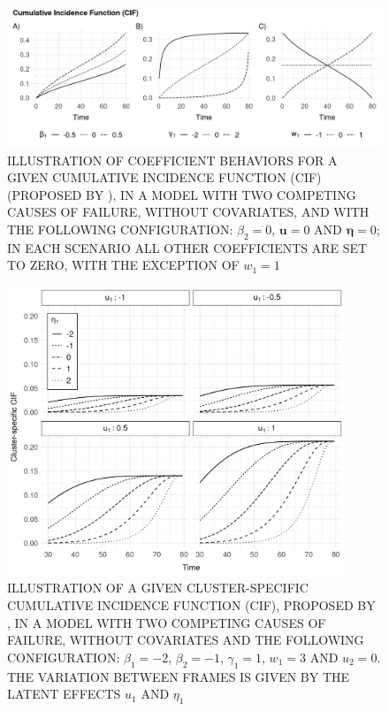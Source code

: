 \documentclass[a4paper,12pt]{article}
\begin{document}
\begin{figure}[H]
 \centering \includegraphics[width=\textwidth]{pics/cifcoefs-1.png}
 \caption{ILLUSTRATION OF COEFFICIENT BEHAVIORS FOR A GIVEN CUMULATIVE
          INCIDENCE FUNCTION (CIF) (PROPOSED BY ),
          IN A MODEL WITH TWO COMPETING CAUSES OF FAILURE, WITHOUT
          COVARIATES, AND WITH THE FOLLOWING CONFIGURATION: \(\beta_{2}
          = 0\), \(\bm{u} = 0\) AND \(\bm{\eta} = 0\); IN EACH SCENARIO
          ALL OTHER COEFFICIENTS ARE SET TO ZERO, WITH THE EXCEPTION
          OF \(w_{1} = 1\)}
 \label{fig:cifcoefs}
\end{figure}

\begin{figure}[H]
 \centering
 \includegraphics[width=0.9\textwidth]{pics/cif-1.png}
 \caption{ILLUSTRATION OF A GIVEN CLUSTER-SPECIFIC CUMULATIVE INCIDENCE
          FUNCTION (CIF), PROPOSED BY , IN A MODEL
          WITH TWO COMPETING CAUSES OF FAILURE, WITHOUT COVARIATES AND
          THE FOLLOWING CONFIGURATION: \(\beta_{1} = -2\),
          \(\beta_{2} = -1\), \(\gamma_{1} = 1\), \(w_{1} = 3\) AND
          \(u_{2} = 0\). THE VARIATION BETWEEN FRAMES IS GIVEN BY THE
          LATENT EFFECTS \(u_{1}\) AND \(\eta_{1}\)}
 \label{fig:cif}
\end{figure}
\end{document}

